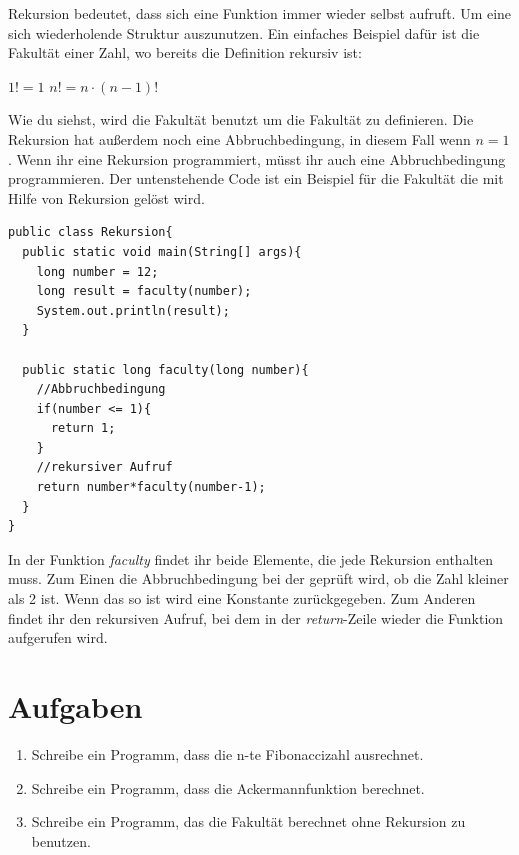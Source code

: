 Rekursion bedeutet, dass sich eine Funktion immer wieder selbst aufruft. Um eine sich wiederholende Struktur auszunutzen. Ein einfaches Beispiel dafür ist die Fakultät einer Zahl, wo bereits die Definition rekursiv ist:

\begin{center}
	$1! = 1$
	$n! = n\cdot (n-1)!$
\end{center}

Wie du siehst, wird die Fakultät benutzt um die Fakultät zu definieren. Die Rekursion hat außerdem noch eine Abbruchbedingung, in diesem Fall wenn $n=1$. Wenn ihr eine Rekursion programmiert, müsst ihr auch eine Abbruchbedingung programmieren. Der untenstehende Code ist ein Beispiel für die Fakultät die mit Hilfe von Rekursion gelöst wird.

\begin{minipage}{\textwidth}
\begin{lstlisting}
public class Rekursion{
  public static void main(String[] args){
    long number = 12;
    long result = faculty(number);
    System.out.println(result);
  }
  
  public static long faculty(long number){
    //Abbruchbedingung
    if(number <= 1){
      return 1;
    }
    //rekursiver Aufruf
    return number*faculty(number-1);
  }
}
\end{lstlisting}
\end{minipage}

In der Funktion \textit{faculty} findet ihr beide Elemente, die jede Rekursion enthalten muss. Zum Einen die Abbruchbedingung bei der geprüft wird, ob die Zahl kleiner als 2 ist. Wenn das so ist wird eine Konstante zurückgegeben. Zum Anderen findet ihr den rekursiven Aufruf, bei dem in der \textit{return}-Zeile wieder die Funktion aufgerufen wird.

\section{Aufgaben}

\begin{enumerate}
	\item Schreibe ein Programm, dass die n-te Fibonaccizahl ausrechnet.
	\item Schreibe ein Programm, dass die Ackermannfunktion berechnet.
	\item Schreibe ein Programm, das die Fakultät berechnet ohne Rekursion zu benutzen.
\end{enumerate}
